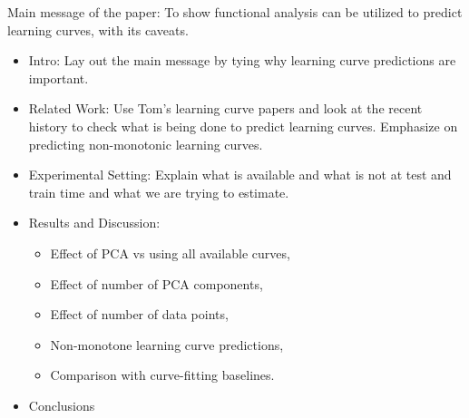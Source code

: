\documentclass{tran-l}
\theoremstyle{definition}
\theoremstyle{remark}
\numberwithin{equation}{section}
\begin{document}
Main message of the paper: To show functional analysis can be utilized to predict learning curves, with its caveats.
\begin{itemize}
  \item Intro: Lay out the main message by tying why learning curve predictions are important. 
  \item Related Work: Use Tom's learning curve papers and look at the recent history to check what is being done to predict learning curves. Emphasize on predicting non-monotonic learning curves.
  \item Experimental Setting: Explain what is available and what is not at test and train time and what we are trying to estimate.
  \item Results and Discussion:
    \begin{itemize}
      \item Effect of PCA vs using all available curves,
      \item Effect of number of PCA components,
      \item Effect of number of data points,
      \item Non-monotone learning curve predictions,
      \item Comparison with curve-fitting baselines.
    \end{itemize}
  \item Conclusions
\end{itemize}
\end{document}
